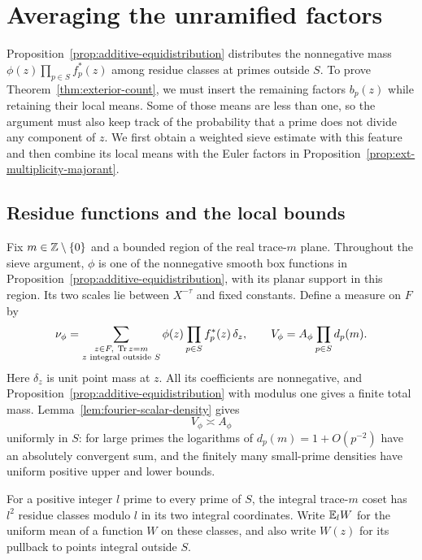 \section{Averaging the unramified factors}\label{sec:sieve}

Proposition~\ref{prop:additive-equidistribution} distributes the
nonnegative mass $\phi(z)\prod_{p\in S}f_p^*(z)$ among residue classes at
primes outside $S$.  To prove Theorem~\ref{thm:exterior-count}, we must
insert the remaining
factors $b_p(z)$ while retaining their local means.  Some of those means are
less than one, so the argument must also keep track of the probability that
a prime does not divide any component of $z$.  We first obtain a weighted
sieve estimate with this feature and then combine its local means with the
Euler factors in Proposition~\ref{prop:ext-multiplicity-majorant}.

\subsection{Residue functions and the local bounds}

Fix $m\in\mathbb Z\setminus\{0\}$ and a bounded region of the real trace-$m$
plane.  Throughout the sieve argument, $\phi$ is one of the nonnegative
smooth box functions in Proposition~\ref{prop:additive-equidistribution},
with its planar support in this region.  Its two scales lie between
$X^{-\tau}$ and
fixed constants.  Define a measure on $F$ by
\begin{equation}\label{eq:sieve-measure}
 \nu_\phi
 =\sum_{\substack{z\in F,\ \operatorname{Tr} z=m\\z\text{ integral outside }S}}
       \phi(z)\prod_{p\in S}f_p^*(z)\,\delta_z,
 \qquad
 V_\phi=A_\phi\prod_{p\in S}d_p(m).
\end{equation}
Here $\delta_z$ is unit point mass at $z$.  All its coefficients are
nonnegative, and Proposition~\ref{prop:additive-equidistribution} with
modulus one gives a finite total mass.
Lemma~\ref{lem:fourier-scalar-density} gives
\begin{equation}\label{eq:sieve-volume}
 V_\phi\asymp A_\phi
\end{equation}
uniformly in $S$: for large primes the logarithms of $d_p(m)=1+O(p^{-2})$
have an absolutely convergent sum, and the finitely many small-prime
densities have uniform positive upper and lower bounds.

For a positive integer $l$ prime to every prime of $S$, the integral
trace-$m$ coset has $l^2$ residue classes modulo $l$ in its two integral
coordinates.  Write $\mathbb E_l W$ for the uniform mean of a function $W$ on
these classes, and also write $W(z)$ for its pullback to points integral
outside $S$.

